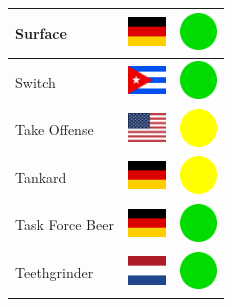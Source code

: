 \documentclass[12pt, a4paper, twoside]{report}
\begin{document}
\begin{center}
\begin{longtable}{|p{5cm}|p{2cm}|p{2cm}|}
			Surface & \includegraphics[width=1cm]{4x3/de} & \includegraphics[width=1cm]{likes/y} \\ \hline
			Switch & \includegraphics[width=1cm]{4x3/cu} & \includegraphics[width=1cm]{likes/y} \\ \hline
			Take Offense & \includegraphics[width=1cm]{4x3/us} & \includegraphics[width=1cm]{likes/m} \\ \hline
			Tankard & \includegraphics[width=1cm]{4x3/de} & \includegraphics[width=1cm]{likes/m} \\ \hline
			Task Force Beer & \includegraphics[width=1cm]{4x3/de} & \includegraphics[width=1cm]{likes/y} \\ \hline
			Teethgrinder & \includegraphics[width=1cm]{4x3/nl} & \includegraphics[width=1cm]{likes/y} \\ \hline

\end{longtable}
\end{center}
\end{document}
